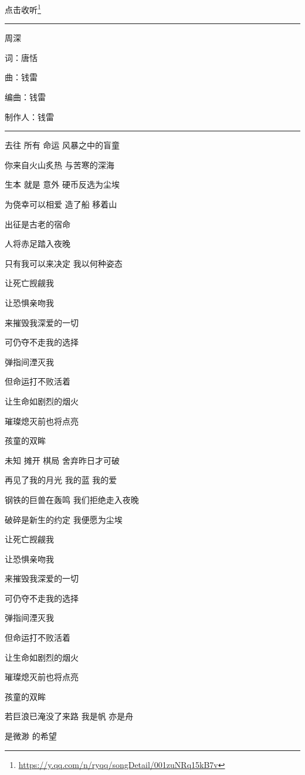 \documentclass[]{ctexbook}
\renewcommand{\href}[2]{#2\footnote{\url{#1}}}
\begin{document}
\href{https://y.qq.com/n/ryqq/songDetail/001zuNRq15kB7v}{点击收听}

\begin{center}\rule{0.5\linewidth}{0.5pt}\end{center}

周深

词：唐恬

曲：钱雷

编曲：钱雷

制作人：钱雷

\begin{center}\rule{0.5\linewidth}{0.5pt}\end{center}

去往 所有 命运 风暴之中的盲童

你来自火山炙热 与苦寒的深海

生本 就是 意外 硬币反选为尘埃

为侥幸可以相爱 造了船 移着山

出征是古老的宿命

人将赤足踏入夜晚

只有我可以来决定 我以何种姿态

让死亡觊觎我

让恐惧亲吻我

来摧毁我深爱的一切

可仍夺不走我的选择

弹指间湮灭我

但命运打不败活着

让生命如剧烈的烟火

璀璨熄灭前也将点亮

孩童的双眸

未知 摊开 棋局 舍弃昨日才可破

再见了我的月光 我的蓝 我的爱

钢铁的巨兽在轰鸣 我们拒绝走入夜晚

破碎是新生的约定 我便愿为尘埃

让死亡觊觎我

让恐惧亲吻我

来摧毁我深爱的一切

可仍夺不走我的选择

弹指间湮灭我

但命运打不败活着

让生命如剧烈的烟火

璀璨熄灭前也将点亮

孩童的双眸

若巨浪已淹没了来路 我是帆 亦是舟

是微渺 的希望
\end{document}
